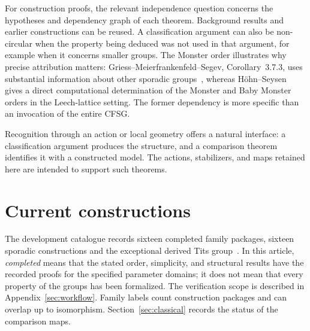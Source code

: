 \documentclass[11pt]{article}
\numberwithin{equation}{section}
\theoremstyle{definition}
\begin{document}
For construction proofs, the relevant independence question concerns
the hypotheses and dependency graph of each theorem. Background results
and earlier constructions can be reused. A classification argument can
also be non-circular when the property being deduced was not used in
that argument, for example when it concerns smaller groups.
The Monster order illustrates why precise attribution matters:
Griess--Meierfrankenfeld--Segev, Corollary~3.7.3, uses substantial
information about other sporadic groups~\cite{GMS}, whereas
H\"ohn--Seysen~\cite{MonsterOrder} gives a direct computational
determination of the Monster and Baby Monster orders in the
Leech-lattice setting. The former dependency is more specific than an
invocation of the entire CFSG.

Recognition through an action or local geometry offers a natural
interface: a classification argument produces the structure, and a
comparison theorem identifies it with a constructed model. The actions,
stabilizers, and maps retained here are intended to support such theorems.

\section{Current constructions}\label{sec:inventory}

The development catalogue records sixteen completed family packages, sixteen
sporadic constructions and the exceptional derived Tits group~\cite{AtlasSoftware}. In this article,
\emph{completed} means that the stated order, simplicity, and structural
results have the recorded proofs for the specified parameter
domains; it does not mean that every property of the groups has been
formalized. The verification scope is described in
Appendix~\ref{sec:workflow}. Family labels count construction packages
and can overlap up to isomorphism. Section~\ref{sec:classical} records
the status of the comparison maps.
\end{document}
